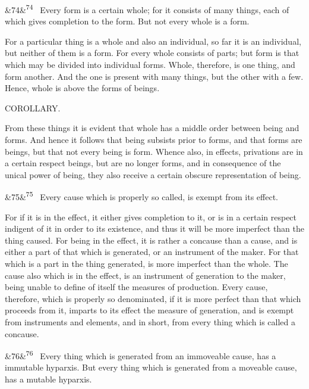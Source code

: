 \documentclass[12pt]{article}
\newcommand{\para}[1][]{\par\noindent\ifx&#1&\else\textsuperscript{\footnotesize #1}~\fi}
\begin{document}
\para[74] Every form is a certain whole; for it consists of many things, each of which gives completion to the form. But not every whole is a form.

For a particular thing is a whole and also an individual, so far it is an individual, but neither of them is a form. For every whole consists of parts; but form is that which may be divided into individual forms. Whole, therefore, is one thing, and form another. And the one is present with many things, but the other with a few. Hence, whole is above the forms of beings.

COROLLARY.

From these things it is evident that whole has a middle order between being and forms. And hence it follows that being subsists prior to forms, and that forms are beings, but that not every being is form. Whence also, in effects, privations are in a certain respect beings, but are no longer forms, and in consequence of the unical power of being, they also receive a certain obscure representation of being.

\para[75] Every cause which is properly so called, is exempt from its effect.

For if it is in the effect, it either gives completion to it, or is in a certain respect indigent of it in order to its existence, and thus it will be more imperfect than the thing caused. For being in the effect, it is rather a concause than a cause, and is either a part of that which is generated, or an instrument of the maker. For that which is a part in the thing generated, is more imperfect than the whole. The cause also which is in the effect, is an instrument of generation to the maker, being unable to define of itself the measures of production. Every cause, therefore, which is properly so denominated, if it is more perfect than that which proceeds from it, imparts to its effect the measure of generation, and is exempt from instruments and elements, and in short, from every thing which is called a concause.

\para[76] Every thing which is generated from an immoveable cause, has a immutable hyparxis. But every thing which is generated from a moveable cause, has a mutable hyparxis.
\end{document}
